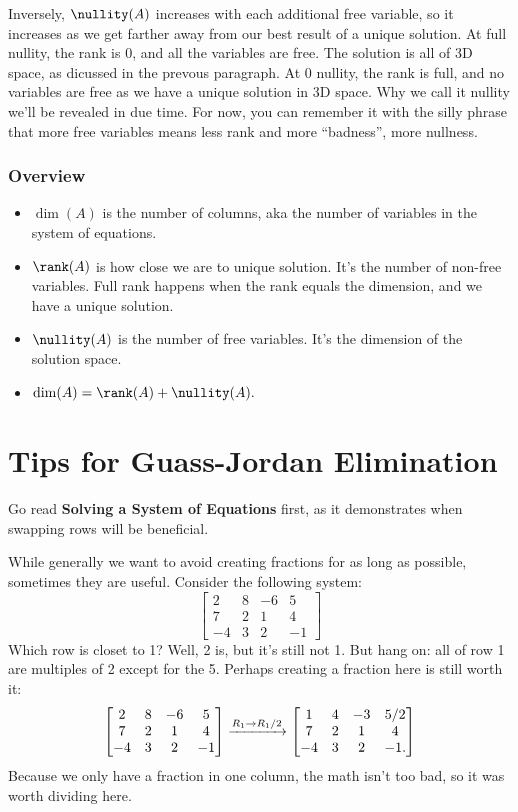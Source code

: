 \documentclass[12pt]{scrartcl}
\begin{document}
Inversely, $\nullity(A)$ increases with each additional free variable, so it increases as we get farther away from our best result of a unique solution. At full nullity, the rank is 0, and all the variables are free. The solution is all of 3D space, as dicussed in the prevous paragraph. At 0 nullity, the rank is full, and no variables are free as we have a unique solution in 3D space. Why we call it nullity we'll be revealed in due time. For now, you can remember it with the silly phrase that more free variables means less rank and more ``badness'', more nullness.

\subsubsection*{Overview}
\begin{itemize}
    \item $\dim(A)$ is the number of columns, aka the number of variables in the system of equations.
    \item $\rank(A)$ is how close we are to unique solution. It's the number of non-free variables. Full rank happens when the rank equals the dimension, and we have a unique solution.
    \item $\nullity(A)$ is the number of free variables. It's the dimension of the solution space.
    \item $\dim(A) = \rank(A) + \nullity(A).$
\end{itemize}

\newpage
\section*{Tips for Guass-Jordan Elimination}
Go read \textbf{Solving a System of Equations} first, as it demonstrates when swapping rows will be beneficial.

While generally we want to avoid creating fractions for as long as possible, sometimes they are useful. Consider the following system:
\[
\begin{bmatrix}
    2 & 8 & -6 & 5 \\
    7 & 2 & 1 & 4 \\
    -4 & 3 & 2 & -1
\end{bmatrix}
\]
Which row is closet to 1? Well, 2 is, but it's still not 1. But hang on: all of row 1 are multiples of 2 except for the 5. Perhaps creating a fraction here is still worth it:
\[
    \begin{bmatrix}
        2 & 8 & -6 & 5 \\
        7 & 2 & 1 & 4 \\
        -4 & 3 & 2 & -1
    \end{bmatrix}
    \xto[R_1 \to R_1/2]
    \begin{bmatrix}
        1 & 4 & -3 & 5/2 \\
        7 & 2 & 1 & 4 \\
        -4 & 3 & 2 & -1.
    \end{bmatrix}
\]
    Because we only have a fraction in one column, the math isn't too bad, so it was worth dividing here.
\end{document}
